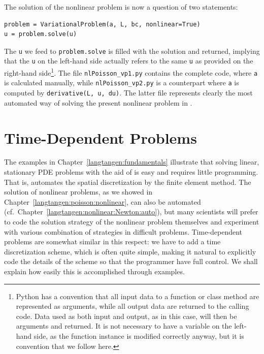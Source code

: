 The solution of the nonlinear problem is now a question of two statements:
\begin{Verbatim}[fontsize=\fontsize{10pt}{10pt},tabsize=8,baselinestretch=1.05,
fontfamily=tt,xleftmargin=7mm]
problem = VariationalProblem(a, L, bc, nonlinear=True)
u = problem.solve(u)
\end{Verbatim}
\noindent
The {\fontsize{12pt}{12pt}\texttt{u}} we feed to {\fontsize{12pt}{12pt}\texttt{problem.solve}} is filled with the solution
and returned, implying that the {\fontsize{12pt}{12pt}\texttt{u}} on the left-hand side actually
refers to the same {\fontsize{12pt}{12pt}\texttt{u}} as provided on the right-hand side\footnote{Python
has a convention that all input data to a function or class method are
represented as arguments, while all output data are returned to the calling
code. Data used as both input and output, as in this case, will then be
arguments and returned. It is not necessary to have a variable on the
left-hand side, as the function instance is modified correctly anyway,
but it is convention that we follow here.}.
The file {\fontsize{12pt}{12pt}\verb!nlPoisson_vp1.py!} contains the complete code, where
{\fontsize{12pt}{12pt}\texttt{a}} is calculated manually, while {\fontsize{12pt}{12pt}\verb!nlPoisson_vp2.py!} is
a counterpart where {\fontsize{12pt}{12pt}\texttt{a}} is computed by {\fontsize{12pt}{12pt}\texttt{derivative(L, u, du)}}.
The latter file represents clearly the most automated way of solving
the present nonlinear problem in \fenics.


\section{Time-Dependent Problems}
\label{langtangen:timedep}

The examples in Chapter~\ref{langtangen:fundamentals}
illustrate that solving linear, stationary PDE problems
with the aid of \fenics{} is easy and requires little programming.
That is, \fenics{} automates the spatial discretization by the
finite element method.
The solution of nonlinear problems, as we showed in Chapter~\ref{langtangen:poisson:nonlinear}, can also be automated (cf.~Chapter~\ref{langtangen:nonlinear:Newton:auto}),
but many scientists will prefer to code the solution strategy of the
nonlinear problem themselves and experiment with various combination of
strategies in
difficult problems. Time-dependent problems are somewhat similar in
this respect: we have to add a time discretization scheme, which
is often quite simple, making it natural to explicitly code the
details of the scheme so that the programmer have full control.
We shall explain how easily this is accomplished through examples.

